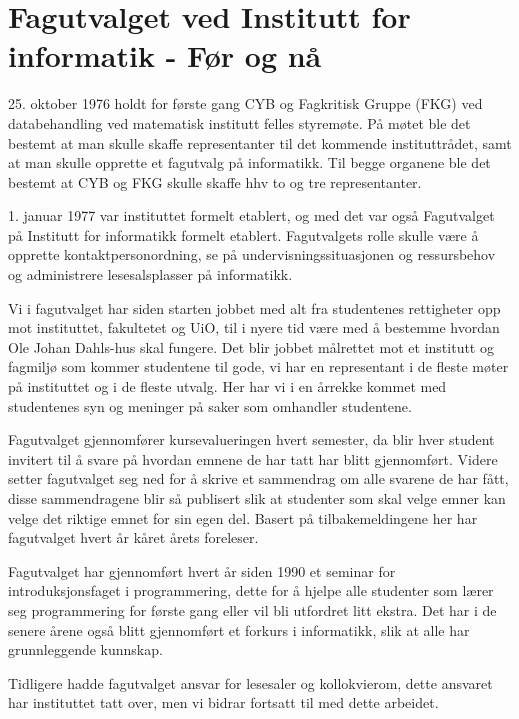 \chapter[FUI]{Fagutvalget ved Institutt for informatik - Før og nå}

\author{Skrevet av Dennis Norheim}

25. oktober 1976 holdt for første gang CYB og Fagkritisk Gruppe (FKG) ved databehandling ved matematisk institutt felles styremøte. På møtet ble det bestemt at man skulle skaffe representanter til det kommende instituttrådet, samt at man skulle opprette et fagutvalg på informatikk. Til begge organene ble det bestemt at CYB og FKG skulle skaffe hhv to og tre representanter. 

1. januar 1977 var instituttet formelt etablert, og med det var også Fagutvalget på Institutt for informatikk formelt etablert. Fagutvalgets rolle skulle være å opprette kontaktpersonordning, se på undervisningssituasjonen og ressursbehov og administrere lesesalsplasser på informatikk.

Vi i fagutvalget har siden starten jobbet med alt fra studentenes rettigheter opp mot instituttet, fakultetet og UiO, til i nyere tid være med å bestemme hvordan Ole Johan Dahls-hus skal fungere. Det blir jobbet målrettet mot et institutt og fagmiljø som kommer studentene til gode, vi har en representant i de fleste møter på instituttet og i de fleste utvalg. Her har vi i en årrekke kommet med studentenes syn og meninger på saker som omhandler studentene. 

Fagutvalget gjennomfører kursevalueringen hvert semester, da blir hver student invitert til å svare på hvordan emnene de har tatt har blitt gjennomført. Videre setter fagutvalget seg ned for å skrive et sammendrag om alle svarene de har fått, disse sammendragene blir så publisert slik at studenter som skal velge emner kan velge det riktige emnet for sin egen del. Basert på tilbakemeldingene her har fagutvalget hvert år kåret årets foreleser. 

Fagutvalget har gjennomført hvert år siden 1990 et seminar for introduksjonsfaget i programmering, dette for å hjelpe alle studenter som lærer seg programmering for første gang eller vil bli utfordret litt ekstra. Det har i de senere årene også blitt gjennomført et forkurs i informatikk, slik at alle har grunnleggende kunnskap. 

Tidligere hadde fagutvalget ansvar for lesesaler og kollokvierom, dette ansvaret har instituttet tatt over, men vi bidrar fortsatt til med dette arbeidet.
